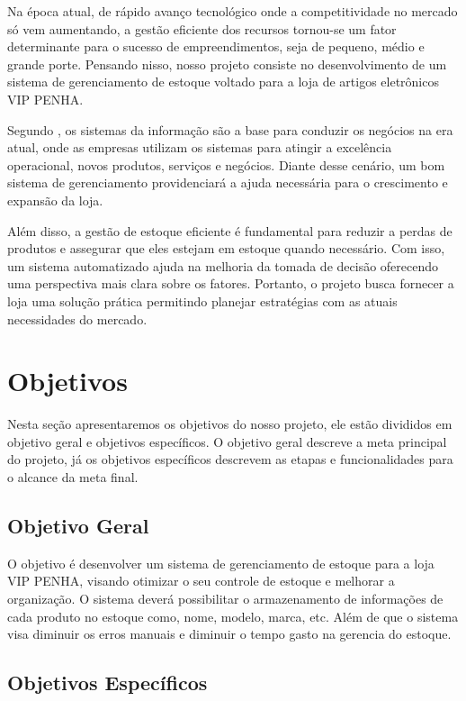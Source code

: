\documentclass[
	12pt,				%
	openright,			%
	twoside,			%
	a4paper,			%
	english,			%
	french,				%
	spanish,			%
	brazil				%
	]{abntex2}
\begin{document}
Na época atual, de rápido avanço tecnológico onde a competitividade no mercado só vem aumentando, a gestão eficiente dos recursos tornou-se um fator determinante para o sucesso de empreendimentos, seja de pequeno, médio e grande porte. Pensando nisso, nosso projeto consiste no desenvolvimento de um sistema de gerenciamento de estoque voltado para a loja de artigos eletrônicos VIP PENHA.

Segundo   , os sistemas da informação são a base para conduzir os negócios na era atual, onde as empresas utilizam os sistemas para atingir a excelência operacional, novos produtos, serviços e negócios. Diante desse cenário, um bom sistema de gerenciamento providenciará a ajuda necessária para o crescimento e expansão da loja.

Além disso, a gestão de estoque eficiente é fundamental para reduzir a perdas de produtos e assegurar que eles estejam em estoque quando necessário. Com isso, um sistema automatizado ajuda na melhoria da tomada de decisão oferecendo uma perspectiva mais clara sobre os fatores. Portanto, o projeto busca fornecer a loja uma solução prática permitindo planejar estratégias com as atuais necessidades do mercado.


\section{Objetivos}

Nesta seção apresentaremos os objetivos do nosso projeto, ele estão divididos em objetivo geral e objetivos específicos. O objetivo geral descreve a meta principal do projeto, já os objetivos específicos descrevem as etapas e funcionalidades para o alcance da meta final.

\subsection{Objetivo Geral}

O objetivo é desenvolver um sistema de gerenciamento de estoque para a loja VIP PENHA, visando otimizar o seu controle de estoque e melhorar a organização. O sistema deverá possibilitar o armazenamento de informações de cada produto no estoque como, nome, modelo, marca, etc. Além de que o sistema visa diminuir os erros manuais e diminuir o tempo gasto na gerencia do estoque.

\subsection{Objetivos Específicos}
\end{document}
